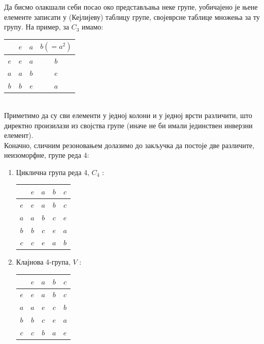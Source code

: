 \documentclass{report}
\theoremstyle{plain}
\theoremstyle{definition}
\begin{document}
Да бисмо олакшали себи посао око представљања неке групе, уобичајено је њене елементе записати у (Кејлијеву) таблицу групе, својеврсне таблице множења за ту групу. На пример, за $C_3$ имамо:\\

\begin{tabular}{c|c c c}
      & $e$ & $a$ & $b(=a^2)$ \\ \hline
  $e$ & $e$ & $a$ & $b$ \\
  $a$ & $a$ & $b$ & $e$ \\
  $b$ & $b$ & $e$ & $a$ \\
\end{tabular}\\

Приметимо да су сви елементи у једној колони и у једној врсти различити, што директно произилази из својства групе (иначе не би имали јединствен инверзни елемент).\\

Коначно, сличним резоновањем долазимо до закључка да постоје две различите, неизоморфне, групе реда 4:
\begin{enumerate}
  \item Циклична група реда 4, $C_4$ :
  \begin{tabular}{c|c c c c}
      & $e$ & $a$ & $b$ & $c$ \\ \hline
  $e$ & $e$ & $a$ & $b$ & $c$ \\
  $a$ & $a$ & $b$ & $c$ & $e$ \\
  $b$ & $b$ & $c$ & $e$ & $a$ \\
  $c$ & $c$ & $e$ & $a$ & $b$ \\
  \end{tabular}
  \item Клајнова 4-група, $V$ :
  \begin{tabular}{c|c c c c}
      & $e$ & $a$ & $b$ & $c$ \\ \hline
  $e$ & $e$ & $a$ & $b$ & $c$ \\ 
  $a$ & $a$ & $e$ & $c$ & $b$ \\
  $b$ & $b$ & $c$ & $e$ & $a$ \\
  $c$ & $c$ & $b$ & $a$ & $e$ \\
  \end{tabular}
\end{enumerate}
\end{document}
